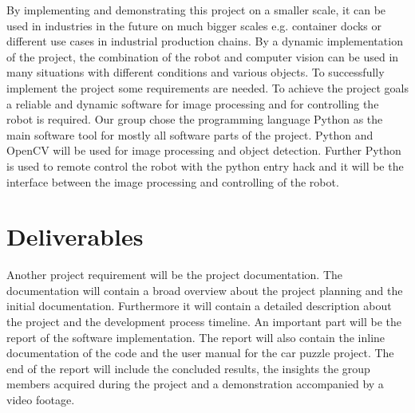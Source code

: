 \documentclass[a4paper, 12pt]{scrartcl}%
\begin{document}
	By implementing and demonstrating this project on a smaller scale, it can be used in industries in the future on much bigger scales e.g. container docks or different use cases in industrial production chains. By a dynamic implementation of the project, the combination of the robot and computer vision can be used in many situations with different conditions and various objects.\newline
	To successfully implement the project some requirements are needed. To achieve the project goals a reliable and dynamic software for image processing and for controlling the robot is required. Our group chose the programming language Python as the main software tool for mostly all software parts of the project. Python and OpenCV will be used for image processing and object detection. Further Python is used to remote control the robot with the python entry hack and it will be the interface between the image processing and controlling of the robot.\newline
	
	\section{Deliverables}
	Another project requirement will be the project documentation. The documentation will contain a broad overview about the project planning and the initial documentation. Furthermore it will contain a detailed description about the project and the development process timeline. An important part will be the report of the software implementation. The report will also contain the inline documentation of the code and the user manual for the car puzzle project.\newline
	The end of the report will include the concluded results, the insights the group members acquired during the project and a demonstration accompanied by a video footage.\newline
	
\end{document}
